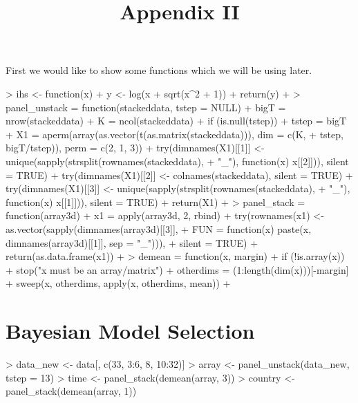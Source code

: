 \documentclass{article}
\title{Appendix II}
\begin{document}

\maketitle
\hrulefill
\vspace{0.5cm}

First we would like to show some functions which we will be using later.
\begin{Schunk}
\begin{Sinput}
> ihs <- function(x) {
+     y <- log(x + sqrt(x^2 + 1))
+     return(y)
+ }
> panel_unstack = function(stackeddata, tstep = NULL) {
+     bigT = nrow(stackeddata)
+     K = ncol(stackeddata)
+     if (is.null(tstep)) 
+         tstep = bigT
+     X1 = aperm(array(as.vector(t(as.matrix(stackeddata))), dim = c(K, 
+         tstep, bigT/tstep)), perm = c(2, 1, 3))
+     try(dimnames(X1)[[1]] <- unique(sapply(strsplit(rownames(stackeddata), 
+         "_"), function(x) x[[2]])), silent = TRUE)
+     try(dimnames(X1)[[2]] <- colnames(stackeddata), silent = TRUE)
+     try(dimnames(X1)[[3]] <- unique(sapply(strsplit(rownames(stackeddata), 
+         "_"), function(x) x[[1]])), silent = TRUE)
+     return(X1)
+ }
> panel_stack = function(array3d) {
+     x1 = apply(array3d, 2, rbind)
+     try(rownames(x1) <- as.vector(sapply(dimnames(array3d)[[3]], 
+         FUN = function(x) paste(x, dimnames(array3d)[[1]], sep = "_"))), 
+         silent = TRUE)
+     return(as.data.frame(x1))
+ }
> demean = function(x, margin) {
+     if (!is.array(x)) 
+         stop("x must be an array/matrix")
+     otherdims = (1:length(dim(x)))[-margin]
+     sweep(x, otherdims, apply(x, otherdims, mean))
+ }
\end{Sinput}
\end{Schunk}

\section{Bayesian Model Selection}

\begin{Schunk}
\begin{Sinput}
> data_new <- data[, c(33, 3:6, 8, 10:32)]
> array <- panel_unstack(data_new, tstep = 13)
> time <- panel_stack(demean(array, 3))
> country <- panel_stack(demean(array, 1))
\end{Sinput}
\end{Schunk}
\end{document}
